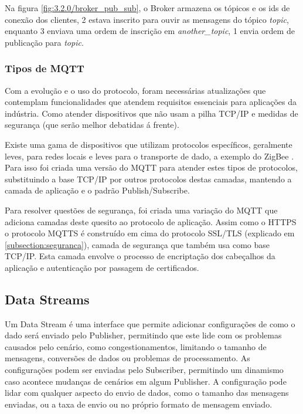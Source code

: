 Na figura \ref{fig:3.2.0/broker_pub_sub}, o Broker armazena os tópicos e os ids de conexão dos clientes, 2 estava inscrito para ouvir as mensagens do tópico \textit{topic}, enquanto 3 enviava uma ordem de inscrição em \textit{another\_topic}, 1 envia ordem de publicação para \textit{topic}.


\subsubsection{Tipos de MQTT}
\label{subsubsection:tipos_mqtt}

Com a evolução e o uso do protocolo, foram necessárias atualizações que contemplam funcionalidades que atendem  requisitos essenciais para aplicações da indústria. Como atender dispositivos que não usam a pilha TCP/IP e medidas de segurança (que serão melhor debatidas á frente). 

Existe uma gama de dispositivos que utilizam protocolos específicos, geralmente leves, para redes locais e leves para o transporte de dado, a exemplo do ZigBee \cite{zigbee}. Para isso foi criada uma versão do MQTT para atender estes tipos de protocolos, substituindo a base TCP/IP por outros protocolos destas camadas, mantendo a camada de aplicação e o padrão Publish/Subscribe.

Para resolver questões de segurança, foi criada uma variação do MQTT que adiciona camadas deste quesito ao protocolo de aplicação. Assim como o HTTPS o protocolo MQTTS é construído em cima do protocolo SSL/TLS (explicado em \ref{subsection:seguranca}), camada de segurança que também usa como base TCP/IP. Esta camada envolve o processo de encriptação dos cabeçalhos da aplicação e autenticação por passagem de certificados.

\subsection{Data Streams}
\label{section:data_stream}

Um Data Stream é uma interface que permite adicionar configurações de como o dado será enviado pelo Publisher, permitindo que este lide com os problemas causados pelo cenário, como congestionamentos, limitando o tamanho de mensagens, conversões de dados ou problemas de processamento. As configurações podem ser enviadas pelo Subscriber, permitindo um dinamismo caso acontece mudanças de cenários em algum Publisher. A configuração pode lidar com qualquer aspecto do envio de dados, como o tamanho das mensagens enviadas, ou a taxa de envio ou no próprio formato de mensagem enviado.

